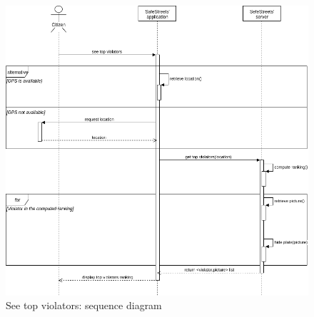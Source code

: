 \documentclass{article}
\begin{document}
		\begin{figure}[H]
			\includegraphics[width=\linewidth]{Images/Top_violators_sequence_diagram.png}
			\caption{See top violators: sequence diagram}
		\end{figure}		
		
\end{document}
